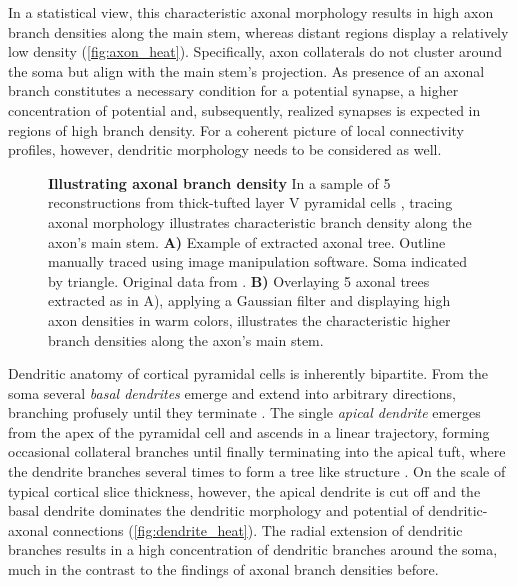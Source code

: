 In a statistical view, this characteristic axonal morphology results
in high axon branch densities along the main stem, whereas distant
regions display a relatively low density
(\autoref{fig:axon_heat}). Specifically, axon collaterals do not
cluster around the soma but align with the main stem's projection. As
presence of an axonal branch constitutes a necessary condition for a
potential synapse, a higher concentration of potential and,
subsequently, realized synapses is expected in regions of high branch
density. For a coherent picture of local connectivity profiles,
however, dendritic morphology needs to be considered as well. 

 
\begin{figure}[!htbp]
  \centering 
    \caption{%
      \textbf{Illustrating axonal branch density}
      In a sample of 5 reconstructions from thick-tufted layer V pyramidal
      cells \parencite{Romand2011}, tracing axonal morphology illustrates
      characteristic branch density along the axon's main
      stem. \textbf{A)} Example of extracted axonal tree. Outline manually
      traced using image manipulation software. Soma indicated by
      triangle. Original data from \textcite{Romand2011}. \textbf{B)}
      Overlaying 5 axonal trees extracted as in A), 
      applying a Gaussian filter and displaying high axon densities in
      warm colors, illustrates the characteristic higher branch
      densities along the axon's main stem.}
  \label{fig:axon_heat}
\end{figure}


Dendritic anatomy of cortical pyramidal cells is inherently bipartite.
From the soma several \textit{basal dendrites}
emerge and extend into arbitrary directions, branching profusely until
they terminate . The single \textit{apical dendrite} emerges from the apex of the pyramidal cell and ascends in
a linear trajectory, forming occasional collateral branches until
finally terminating into the apical tuft, where the dendrite branches
several times to form a tree like structure \parencite{Feldman1984}.
On the scale of typical cortical slice thickness, however, the apical
dendrite is cut off and the basal dendrite dominates the dendritic
morphology and potential of dendritic-axonal connections
(\autoref{fig:dendrite_heat}). The radial extension of dendritic
branches results in a high concentration of dendritic branches around the
soma, much in the contrast to the findings of axonal branch densities
before.

